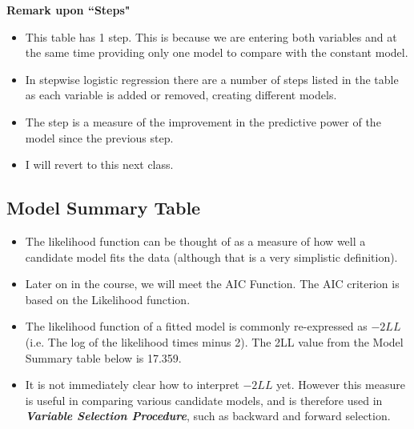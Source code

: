 \documentclass[a4paper,12pt]{article}
\begin{document}
\noindent \textbf{Remark upon ``Steps"}
\begin{itemize}
	\item This table has 1 step. This is because we are entering both variables and at the same
	time providing only one model to compare with the constant model. 
	\item In stepwise logistic regression there are a number of steps listed in the table as each variable is added or
	removed, creating different models. 
	\item The step is a measure of the improvement in the
	predictive power of the model since the previous step. 
	\item I will revert to this next class.
\end{itemize}
\newpage

\subsection{Model Summary Table}

\begin{itemize}
	\item The likelihood function can be thought of as a measure of how well a candidate model fits the data (although that is a very simplistic definition). 
	\item Later on in the course, we will meet the AIC Function. The AIC criterion is based on the Likelihood function.
	\item The likelihood function of a fitted model is commonly re-expressed as $-2LL$ (i.e. The log of the likelihood times minus 2). The 2LL value from the Model Summary table below is 17.359.
	\item It is not immediately clear how to interpret $-2LL$ yet. However this measure is useful in comparing various candidate models, and is therefore used in \textbf{\textit{Variable Selection Procedure}}, such as backward and forward selection.
\end{itemize}
\end{document}
